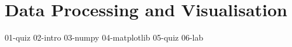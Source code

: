 \chapter{Data Processing and Visualisation}

{01-quiz}
{02-intro}
{03-numpy}
{04-matplotlib}
{05-quiz}
{06-lab}

